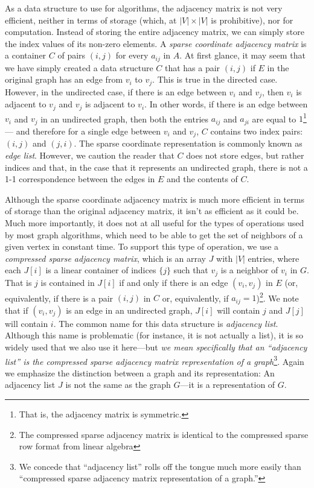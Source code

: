 As a data structure to use for algorithms, the adjacency matrix is not very efficient, neither in terms of storage (which, at $|V|\times |V|$ is prohibitive), nor for computation. Instead of storing the entire
adjacency matrix, we can simply store the index values of its non-zero elements.  A \emph{sparse coordinate adjacency
matrix} is a container $C$ of pairs $(i, j)$ for every $a_{ij}$ in $A$.
%
At first glance, it may seem that we have simply created a data structure $C$ that has a pair $(i,j)$ if $E$ in the
original graph has an edge from $v_i$ to $v_j$.  This is true in the directed case.  However, in the undirected case, if there is an edge between $v_i$ and $v_j$, then $v_i$ is adjacent to $v_j$ and $v_j$ is adjacent to $v_i$.  In other words, if there is an edge between $v_i$ and  $v_j$ in an undirected graph, then both the entries $a_{ij}$ and $a_{ji}$ are equal to $1$\footnote{That is, the adjacency matrix is symmetric.} --- and therefore for a single edge between $v_i$ and $v_j$,  $C$ contains two index pairs: $(i, j)$  and $(j, i)$.   The sparse coordinate representation is commonly known as \emph{edge list}.  However, we caution the reader that $C$ does not store edges, but rather indices and that, in the case that it represents an undirected graph, there is not a 1-1 correspondence between the edges in $E$ and the contents of $C$.

Although the sparse coordinate adjacency matrix is much more efficient in terms of storage than the original adjacency matrix, it isn't as efficient as it could be.  
Much more importantly, it does not at all useful for the types of operations used by most graph algorithms, which need to be able to get the set of neighbors of a given vertex in constant time.  
To support this type of operation, we use a \emph{compressed sparse adjacency matrix}, which is an array $J$ with $|V|$ entries, where each $J[i]$ is a linear container of indices $\{ j \}$ such that $v_j$ is a neighbor of $v_i$ in $G$.  
That is $j$ is contained in $J[i]$ if and only if there is an edge $(v_i, v_j)$ in $E$ (or, equivalently, if there is a pair $(i, j)$ in $C$ or, equivalently, if $a_{ij} = 1$)\footnote{The compressed sparse adjacency matrix is identical to the compressed sparse row format from linear algebra}.  
We note that if $(v_i, v_j)$ is an edge in an undirected graph, $J[i]$ will contain $j$ and $J[j]$ will contain $i$. 
The common name for this data structure is \emph{adjacency list}.  
Although this name is problematic (for instance, it is not actually a list),  it is so widely used that we also use it here---but \emph{we mean specifically that an  ``adjacency list'' is the compressed sparse adjacency matrix representation of a graph}\footnote{We concede that ``adjacency list'' rolls off the tongue much more easily than ``compressed sparse adjacency matrix representation of a graph.''}.  
Again we emphasize the distinction between a graph and its representation:  An adjacency list $J$ is not the same as the graph $G$---it is a representation of $G$.


